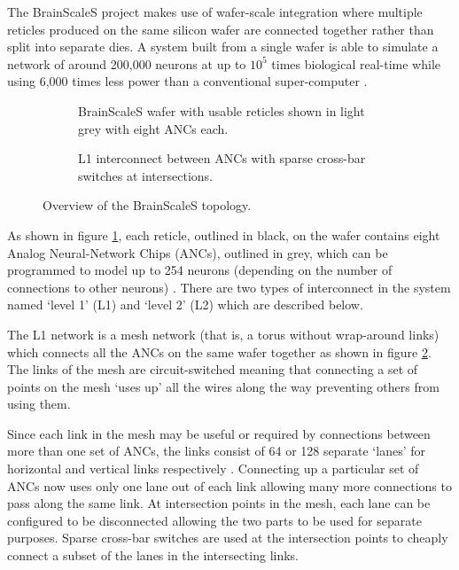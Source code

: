 				The BrainScaleS project makes use of wafer-scale integration where
				multiple reticles produced on the same silicon wafer are connected together
				rather than split into separate dies. A system built from a single wafer
				is able to simulate a network of around 200,000 neurons at up to $10^5$
				times biological real-time while using 6,000 times less power than a
				conventional super-computer \cite{schemmel08}.
				
				\begin{figure}
					\center
					\begin{subfigure}[b]{0.45\textwidth}
						\center
						
						\caption{BrainScaleS wafer with usable reticles shown in light
						grey with eight ANCs each.}
						\label{fig:brainscales-wafer}
					\end{subfigure}
					\hspace{1ex}
					\begin{subfigure}[b]{0.45\textwidth}
						\center
						
						\caption{L1 interconnect between ANCs with sparse cross-bar
						switches at intersections.}
						\label{fig:brainscales-l1}
					\end{subfigure}
					
					\caption{Overview of the BrainScaleS topology.}
					\label{fig:brainscales-topology}
				\end{figure}
				
				As shown in figure \ref{fig:brainscales-wafer}, each reticle, outlined
				in black, on the wafer contains eight Analog Neural-Network Chips
				(ANCs), outlined in grey, which can be programmed to model up to 254
				neurons (depending on the number of connections to other neurons)
				\cite{schemmel10}. There are two types of interconnect in the system
				named `level 1' (L1) and `level 2' (L2) which are described below.
			
				The L1 network is a mesh network (that is, a torus without wrap-around
				links) which connects all the ANCs on the same wafer together as shown
				in figure \ref{fig:brainscales-l1}. The links of the mesh are
				circuit-switched meaning that connecting a set of points on the mesh
				`uses up' all the wires along the way preventing others from using them.
				
				Since each link in the mesh may be useful or required by connections
				between more than one set of ANCs, the links consist of 64 or 128
				separate `lanes' for horizontal and vertical links respectively
				\cite{fieres08}. Connecting up a particular set of ANCs now uses only
				one lane out of each link allowing many more connections to pass along
				the same link. At intersection points in the mesh, each lane can be
				configured to be disconnected allowing the two parts to be used for
				separate purposes. Sparse cross-bar switches are used at the
				intersection points to cheaply connect a subset of the lanes in the
				intersecting links.
				
